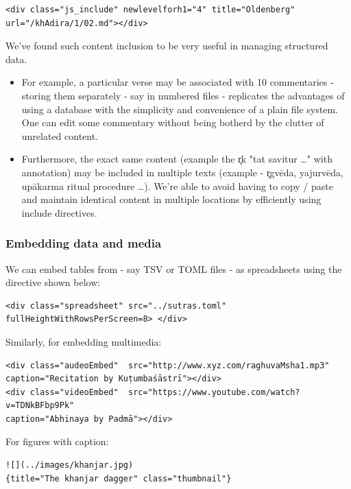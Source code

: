 \documentclass[11pt]{article}
\begin{document}
\begin{verbatim}
<div class="js_include" newlevelforh1="4" title="Oldenberg" url="/khAdira/1/02.md"></div>
\end{verbatim} 

We've found such content inclusion to be very useful in managing structured data. 

\begin{itemize}
\tightlist

\item
For example, a particular verse may be associated with 10 commentaries - storing them separately - say in numbered files - replicates the advantages of using a database with the simplicity and convenience of a plain file system. One can edit some commentary without being botherd by the clutter of unrelated content. 

\item
Furthermore, the exact same content (example the r̥k "tat savitur …" with annotation) may be included in multiple texts (example - r̥gvēda, yajurvēda, upākarma ritual procedure …). We're able to avoid having to copy / paste and maintain identical content in multiple locations by efficiently using include directives. 
\end{itemize}

\subsubsection{Embedding data and media}
We can embed tables from - say TSV or TOML files - as spreadsheets using the directive shown below:

\begin{verbatim}
<div class="spreadsheet" src="../sutras.toml" fullHeightWithRowsPerScreen=8> </div>  
\end{verbatim}

Similarly, for embedding multimedia:
\begin{verbatim}
<div class="audeoEmbed"  src="http://www.xyz.com/raghuvaMsha1.mp3"  
caption="Recitation by Kuṭumbaśāstrī"></div>
<div class="videoEmbed"  src="https://www.youtube.com/watch?v=TDNkBFbp9Pk"  
caption="Abhinaya by Padmā"></div>
\end{verbatim}

For figures with caption:
\begin{verbatim}
![](../images/khanjar.jpg)
{title="The khanjar dagger" class="thumbnail"}
  
\end{verbatim}
\end{document}
